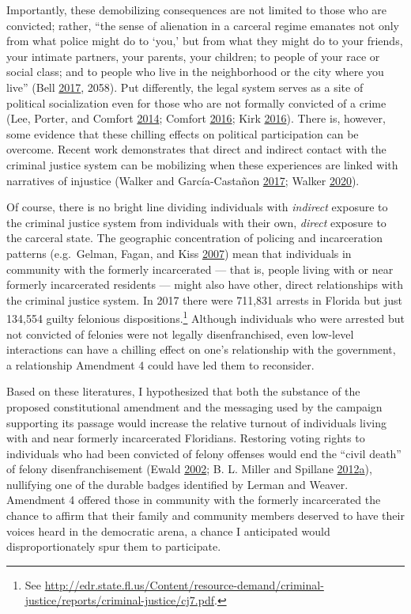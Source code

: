 \documentclass[
  12pt,
]{article}
\begin{document}
Importantly, these demobilizing consequences are not limited to those who are convicted; rather, ``the sense of alienation in a carceral regime emanates not only from what police might do to `you,' but from what they might do to your friends, your intimate partners, your parents, your children; to people of your race or social class; and to people who live in the neighborhood or the city where you live'' (Bell \protect\hyperlink{ref-Bell2017}{2017}, 2058). Put differently, the legal system serves as a site of political socialization even for those who are not formally convicted of a crime (Lee, Porter, and Comfort \protect\hyperlink{ref-Lee2014}{2014}; Comfort \protect\hyperlink{ref-Comfort2016}{2016}; Kirk \protect\hyperlink{ref-Kirk2016}{2016}). There is, however, some evidence that these chilling effects on political participation can be overcome. Recent work demonstrates that direct and indirect contact with the criminal justice system can be mobilizing when these experiences are linked with narratives of injustice (Walker and García-Castañon \protect\hyperlink{ref-Walker2017}{2017}; Walker \protect\hyperlink{ref-Walker2020}{2020}).

Of course, there is no bright line dividing individuals with \emph{indirect} exposure to the criminal justice system from individuals with their own, \emph{direct} exposure to the carceral state. The geographic concentration of policing and incarceration patterns (e.g.~Gelman, Fagan, and Kiss \protect\hyperlink{ref-Gelman2007}{2007}) mean that individuals in community with the formerly incarcerated --- that is, people living with or near formerly incarcerated residents --- might also have other, direct relationships with the criminal justice system. In 2017 there were 711,831 arrests in Florida but just 134,554 guilty felonious dispositions.\footnote{See \url{http://edr.state.fl.us/Content/resource-demand/criminal-justice/reports/criminal-justice/cj7.pdf}.} Although individuals who were arrested but not convicted of felonies were not legally disenfranchised, even low-level interactions can have a chilling effect on one's relationship with the government, a relationship Amendment 4 could have led them to reconsider.

Based on these literatures, I hypothesized that both the substance of the proposed constitutional amendment and the messaging used by the campaign supporting its passage would increase the relative turnout of individuals living with and near formerly incarcerated Floridians. Restoring voting rights to individuals who had been convicted of felony offenses would end the ``civil death'' of felony disenfranchisement (Ewald \protect\hyperlink{ref-Ewald2002}{2002}; B. L. Miller and Spillane \protect\hyperlink{ref-Miller2012}{2012}\protect\hyperlink{ref-Miller2012}{a}), nullifying one of the durable badges identified by Lerman and Weaver. Amendment 4 offered those in community with the formerly incarcerated the chance to affirm that their family and community members deserved to have their voices heard in the democratic arena, a chance I anticipated would disproportionately spur them to participate.
\end{document}
